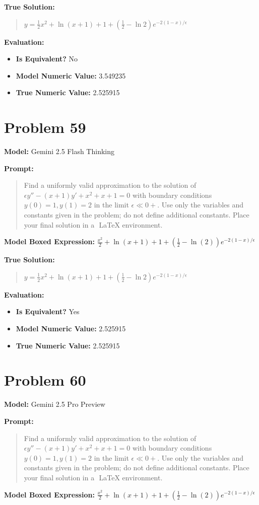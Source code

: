 \documentclass{article}
\begin{document}
\textbf{True Solution:}
\begin{quote}
$y = \frac{1}{2} x^2 + \ln{(x+1)} + 1 + (\frac{1}{2} - \ln{2}) e^{-2(1-x) / \epsilon}$
\end{quote}

\textbf{Evaluation:}
\begin{itemize}
\item \textbf{Is Equivalent?} No
\item \textbf{Model Numeric Value:} 3.549235
\item \textbf{True Numeric Value:} 2.525915
\end{itemize}
\vspace{1cm}
\section*{Problem 59}
\textbf{Model:} Gemini 2.5 Flash Thinking

\textbf{Prompt:}
\begin{quote}
Find a uniformly valid approximation to the solution of $\epsilon y'' - (x+1) y' + x^2 + x + 1 = 0$ with boundary conditions $y(0) = 1, y(1) = 2$ in the limit $\epsilon \ll 0+$. Use only the variables and constants given in the problem; do not define additional constants. Place your final solution in a $\boxed{}$ LaTeX environment.
\end{quote}
\textbf{Model Boxed Expression:} $\frac{x^2}{2} + \ln(x+1) + 1 + \left(\frac{1}{2} - \ln(2)\right)e^{-2(1-x)/\epsilon}$

\textbf{True Solution:}
\begin{quote}
$y = \frac{1}{2} x^2 + \ln{(x+1)} + 1 + (\frac{1}{2} - \ln{2}) e^{-2(1-x) / \epsilon}$
\end{quote}

\textbf{Evaluation:}
\begin{itemize}
\item \textbf{Is Equivalent?} Yes
\item \textbf{Model Numeric Value:} 2.525915
\item \textbf{True Numeric Value:} 2.525915
\end{itemize}
\vspace{1cm}
\section*{Problem 60}
\textbf{Model:} Gemini 2.5 Pro Preview

\textbf{Prompt:}
\begin{quote}
Find a uniformly valid approximation to the solution of $\epsilon y'' - (x+1) y' + x^2 + x + 1 = 0$ with boundary conditions $y(0) = 1, y(1) = 2$ in the limit $\epsilon \ll 0+$. Use only the variables and constants given in the problem; do not define additional constants. Place your final solution in a $\boxed{}$ LaTeX environment.
\end{quote}
\textbf{Model Boxed Expression:} $\frac{x^2}{2} + \ln(x+1) + 1 + \left(\frac{1}{2} - \ln(2)\right) e^{-2(1-x)/\epsilon}$
\end{document}
